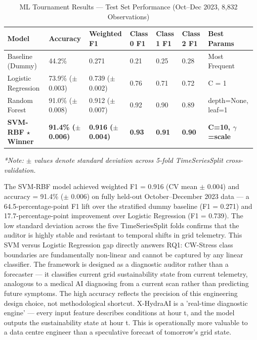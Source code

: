 \documentclass[conference]{IEEEtran}
\begin{document}
\begin{table}[htbp]
\caption{ML Tournament Results — Test Set Performance (Oct–Dec 2023, 8,832 Observations)}
\begin{center}
\begin{tabular}{|l|l|l|l|l|l|l|}
\hline
\textbf{Model} & \textbf{Accuracy} & \textbf{Weighted F1} & \textbf{Class 0 F1} & \textbf{Class 1 F1} & \textbf{Class 2 F1} & \textbf{Best Params} \\ \hline
Baseline (Dummy) & 44.2\% & 0.271 & 0.21 & 0.25 & 0.28 & Most Frequent \\ \hline
Logistic Regression & 73.9\% ($\pm$0.003) & 0.739 ($\pm$0.002) & 0.76 & 0.71 & 0.72 & C = 1 \\ \hline
Random Forest & 91.0\% ($\pm$0.008) & 0.912 ($\pm$0.007) & 0.92 & 0.90 & 0.89 & depth=None, leaf=1 \\ \hline
\textbf{SVM-RBF $\star$ Winner} & \textbf{91.4\% ($\pm$0.006)} & \textbf{0.916 ($\pm$0.004)} & \textbf{0.93} & \textbf{0.91} & \textbf{0.90} & \textbf{C=10, $\gamma$=scale} \\ \hline
\end{tabular}

\vspace{1ex}

\small{\textit{*Note: $\pm$ values denote standard deviation across 5-fold TimeSeriesSplit cross-validation.}}
\end{center}
\end{table}

The SVM-RBF model achieved weighted F1 = 0.916 (CV mean $\pm$ 0.004) and accuracy = 91.4\% ($\pm$ 0.006) on fully held-out October–December 2023 data — a 64.5-percentage-point F1 lift over the stratified dummy baseline (F1 = 0.271) and 17.7-percentage-point improvement over Logistic Regression (F1 = 0.739). The low standard deviation across the five TimeSeriesSplit folds confirms that the auditor is highly stable and resistant to temporal shifts in grid telemetry. This SVM versus Logistic Regression gap directly answers RQ1: CW-Stress class boundaries are fundamentally non-linear and cannot be captured by any linear classifier. The framework is designed as a diagnostic auditor rather than a forecaster — it classifies current grid sustainability state from current telemetry, analogous to a medical AI diagnosing from a current scan rather than predicting future symptoms. The high accuracy reflects the precision of this engineering design choice, not methodological shortcut. X-HydraAI is a 'real-time diagnostic engine' — every input feature describes conditions at hour t, and the model outputs the sustainability state at hour t. This is operationally more valuable to a data centre engineer than a speculative forecast of tomorrow's grid state.
\end{document}
